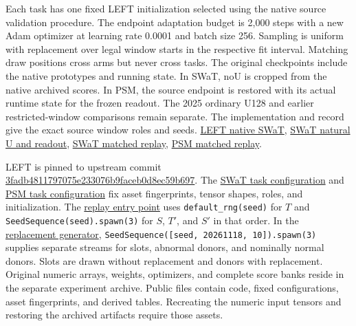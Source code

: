 \documentclass[
  american,
]{article}
\begin{document}
Each task has one fixed LEFT initialization selected using the native
source validation procedure. The endpoint adaptation budget is 2,000
steps with a new Adam optimizer at learning rate 0.0001 and batch size
256. Sampling is uniform with replacement over legal window starts in
the respective fit interval. Matching draw positions cross arms but
never cross tasks. The original checkpoints include the native
prototypes and running state. In SWaT, noU is cropped from the native
archived scores. In PSM, the source endpoint is restored with its actual
runtime state for the frozen readout. The 2025 ordinary U128 and earlier
restricted-window comparisons remain separate. The implementation and
record give the exact source window roles and seeds.
\href{../../docs/experiments/left_native_swat_20261118/RESULTS.md}{LEFT
native SWaT},
\href{../../docs/experiments/left_swat_natural_u_20261118/RESULTS.md}{SWaT
natural U and readout},
\href{../../docs/experiments/left_swat_source_replay_20261118/RESULTS.md}{SWaT
matched replay},
\href{../../docs/experiments/left_psm_replay_20261118/RESULTS.md}{PSM
matched replay}.

LEFT is pinned to upstream commit
\href{https://github.com/DezhengWang/Left/tree/3fadb4811797075e233076b9faceb0d8ec59b697}{3fadb4811797075e233076b9faceb0d8ec59b697}.
The \href{../../configs/left-exposure-swat-20261118.json}{SWaT task
configuration} and
\href{../../configs/left-author-psm-source-replay-20261118.json}{PSM
task configuration} fix asset fingerprints, tensor shapes, roles, and
initialization. The
\href{../../src/hybrid_tsad/left_domain_replay.py}{replay entry point}
uses \texttt{default\_rng(seed)} for \(T\) and
\texttt{SeedSequence(seed).spawn(3)} for \(S\), \(T'\), and \(S'\) in
that order. In the
\href{../../src/hybrid_tsad/left_exposure_bundle.py}{replacement
generator}, \texttt{SeedSequence({[}seed,\ 20261118,\ 10{]}).spawn(3)}
supplies separate streams for slots, abnormal donors, and nominally
normal donors. Slots are drawn without replacement and donors with
replacement. Original numeric arrays, weights, optimizers, and complete
score banks reside in the separate experiment archive. Public files
contain code, fixed configurations, asset fingerprints, and derived
tables. Recreating the numeric input tensors and restoring the archived
artifacts require those assets.
\end{document}
